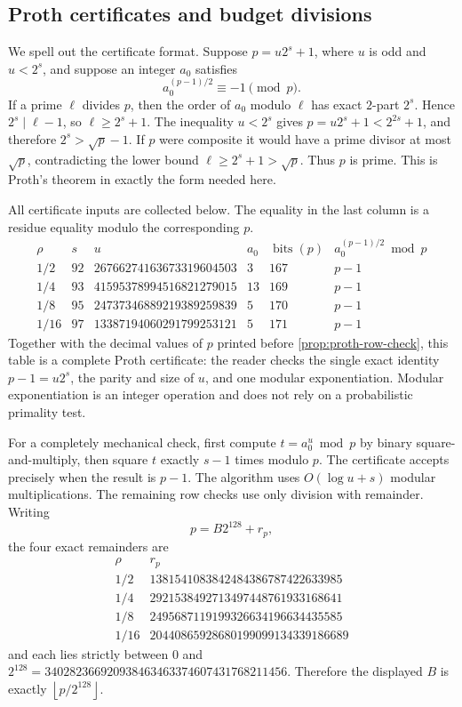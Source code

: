 \documentclass[11pt,a4paper]{amsart}
\numberwithin{equation}{section}
\theoremstyle{remark}
\newcommand{\floor}[1]{\left\lfloor #1\right\rfloor}
\begin{document}
\subsection{Proth certificates and budget divisions}

We spell out the certificate format.  Suppose
\(p=u2^s+1\), where \(u\) is odd and \(u<2^s\), and suppose an integer
\(a_0\) satisfies
\[
                         a_0^{(p-1)/2}\equiv-1\pmod p.
\]
If a prime \(\ell\) divides \(p\), then the order of \(a_0\) modulo
\(\ell\) has exact \(2\)-part \(2^s\).  Hence \(2^s\mid\ell-1\), so
\(\ell\ge2^s+1\).  The inequality \(u<2^s\) gives
\(p=u2^s+1<2^{2s}+1\), and therefore \(2^s>\sqrt p-1\).
If \(p\) were composite it would have a prime divisor at most
\(\sqrt p\), contradicting the lower bound \(\ell\ge2^s+1>\sqrt p\).
Thus \(p\) is prime.  This is Proth's theorem in exactly the form needed
here.

All certificate inputs are collected below.  The equality in the last
column is a residue equality modulo the corresponding \(p\).
\[
\begin{array}{c|r|r|r|r|r}
 \rho&s&u&a_0&\operatorname{bits}(p)&
 a_0^{(p-1)/2}\bmod p\\ \hline
 1/2&92&26766274163673319604503&3&167&p-1\\
 1/4&93&41595378994516821279015&13&169&p-1\\
 1/8&95&24737346889219389259839&5&170&p-1\\
 1/16&97&13387194060291799253121&5&171&p-1
\end{array}
\]
Together with the decimal values of \(p\) printed before
\cref{prop:proth-row-check}, this table is a complete Proth certificate:
the reader checks the single exact identity \(p-1=u2^s\), the parity and
size of \(u\), and one modular exponentiation.  Modular exponentiation is
an integer operation and does not rely on a probabilistic primality test.

For a completely mechanical check, first compute
\(t=a_0^u\bmod p\) by binary square-and-multiply, then square \(t\)
exactly \(s-1\) times modulo \(p\).  The certificate accepts precisely
when the result is \(p-1\).  The algorithm uses
\(O(\log u+s)\) modular multiplications.  The remaining row checks use
only division with remainder.  Writing
\[
                         p=B2^{128}+r_p,
\]
the four exact remainders are
\[
\begin{array}{c|r}
 \rho&r_p\\ \hline
 1/2&1381541083842484386787422633985\\
 1/4&2921538492713497448761933168641\\
 1/8&2495687119199326634196634435585\\
 1/16&20440865928680199099134339186689
\end{array}
\]
and each lies strictly between \(0\) and
\(2^{128}=340282366920938463463374607431768211456\).  Therefore the
displayed \(B\) is exactly \(\floor{p/2^{128}}\).
\end{document}
